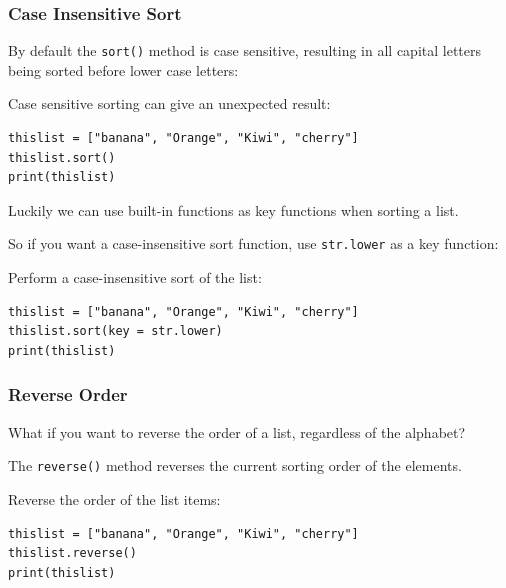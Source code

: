 \documentclass[12pt,a4paper]{article}
\newcommand{\code}[1]{%
	\colorbox{backcolour}{\lstinline{#1}}%
}
\newcommand{\lcode}[1]{%
	\lstinline{#1}%
}
\begin{document}
\subsubsection{Case Insensitive Sort}

By default the \code{sort()} method is case sensitive, resulting in all capital
letters being sorted before lower case letters:

\begin{ebox}
Case sensitive sorting can give an unexpected result:
	\begin{lstlisting}
thislist = ["banana", "Orange", "Kiwi", "cherry"]
thislist.sort()
print(thislist)
	\end{lstlisting}
\tcblower
	\begin{vercode}
	\end{vercode}
\end{ebox}

Luckily we can use built-in functions as key functions when sorting a list.

So if you want a case-insensitive sort function, use \lcode{str.lower} as a key
function:

\begin{ebox}
Perform a case-insensitive sort of the list:
	\begin{lstlisting}
thislist = ["banana", "Orange", "Kiwi", "cherry"]
thislist.sort(key = str.lower)
print(thislist)
	\end{lstlisting}
\tcblower
	\begin{vercode}
	\end{vercode}
\end{ebox}
\subsubsection{Reverse Order}

What if you want to reverse the order of a list, regardless of the alphabet?

The \code{reverse()} method reverses the current sorting order of the elements.

\begin{ebox}
Reverse the order of the list items:
	\begin{lstlisting}
thislist = ["banana", "Orange", "Kiwi", "cherry"]
thislist.reverse()
print(thislist)
	\end{lstlisting}
\tcblower
	\begin{vercode}
	\end{vercode}
\end{ebox}
\end{document}
